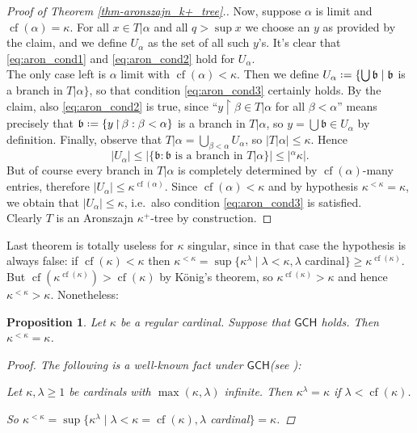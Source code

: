 \documentclass[11pt,a4paper]{report}
\newtheorem{proposition}[theorem]{Proposition}
\theoremstyle{definition}
\theoremstyle{num.custom-title}
\theoremstyle{custom-title}
\DeclareMathOperator{\restr}{\upharpoonright}
\DeclareMathOperator{\cf}{cf}
\newcommand{\GCH}{\ensuremath{\mathsf{GCH}}\xspace}
\newcommand*{\defeq}{\mathrel{\rlap{%
                     \raisebox{0.3ex}{$\cdot$}}%
                     \raisebox{-0.3ex}{$\cdot$}}%
                     =}
\begin{document}
\begin{proof}[Proof of Theorem \ref{thm-aronszajn_k+_tree}.]
Now, suppose $\alpha$ is limit and $\cf(\alpha) = \kappa$. For all $x \in T|\alpha$ and all $q > \sup x$ we choose an $y$ as provided by the claim, and we define $U_\alpha$ as the set of all such $y$'s. It's clear that \eqref{eq:aron_cond1} and \eqref{eq:aron_cond2} hold for $U_\alpha$.\\
The only case left is $\alpha$ limit with $\cf(\alpha) < \kappa$. Then we define $U_\alpha \defeq \{\bigcup \mathfrak{b} \mid \mathfrak{b}$ is a branch in $T|\alpha \}$, so that condition \eqref{eq:aron_cond3} certainly holds. By the claim, also \eqref{eq:aron_cond2} is true, since ``$y \restr \beta \in T|\alpha$ for all $\beta<\alpha$'' means precisely that $\mathfrak{b} \defeq \{y \restr \beta : \beta < \alpha\}$ is a branch in $T|\alpha$, so $y = \bigcup \mathfrak{b} \in U_\alpha$ by definition. Finally, observe that $T|\alpha = \bigcup_{\beta < \alpha} U_\alpha$, so $|T|\alpha| \leq \kappa$. Hence
\[
|U_\alpha| \leq |\{\mathfrak{b} : \mathfrak{b} \text{ is a branch in } T|\alpha\}| \leq |{}^\alpha \kappa|.
\]
But of course every branch in $T|\alpha$ is completely determined by $\cf(\alpha)$-many entries, therefore $|U_\alpha| \leq \kappa^{\cf(\alpha)}$. Since $\cf(\alpha)<\kappa$ and by hypothesis $\kappa^{<\kappa}=\kappa$, we obtain that $|U_\alpha| \leq \kappa$, i.e.\ also condition \eqref{eq:aron_cond3} is satisfied.\\[6pt]
Clearly $T$ is an Aronszajn $\kappa^+$-tree by construction.
\end{proof}

Last theorem is totally useless for $\kappa$ singular, since in that case the hypothesis is always false: if $\cf(\kappa)<\kappa$ then $\kappa^{<\kappa} = \sup\{\kappa^\lambda \mid \lambda < \kappa, \lambda$ cardinal$\} \geq \kappa^{\cf(\kappa)}$. But $\cf(\kappa^{\cf(\kappa)}) > \cf(\kappa)$ by König's theorem, so $\kappa^{\cf(\kappa)} > \kappa$ and hence $\kappa^{<\kappa} > \kappa$. Nonetheless:

\begin{proposition}
Let $\kappa$ be a regular cardinal. Suppose that \GCH holds. Then $\kappa^{<\kappa} = \kappa$.
\begin{proof}
The following is a well-known fact under \GCH (see \cite{Kun2009}):
\begin{center}
Let $\kappa,\lambda \geq 1$ be cardinals with $\max(\kappa,\lambda)$ infinite. Then $\kappa^\lambda = \kappa$ if $\lambda < \cf(\kappa)$.
\end{center}
So $\kappa^{<\kappa} = \sup\{\kappa^\lambda \mid \lambda < \kappa = \cf(\kappa), \lambda$ cardinal$\} = \kappa$.
\end{proof}
\end{proposition}
\end{document}
